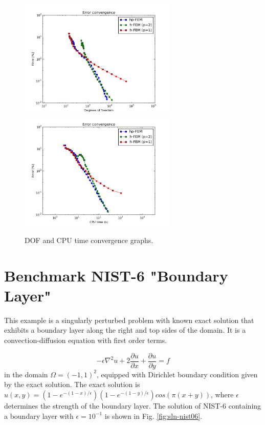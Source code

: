 \documentclass[12pt]{elsarticle}
\begin{document}
\begin{figure}[H]
\centering
\hspace{-50mm}
\includegraphics[width=7.5cm]{nist/nist-5/conv_dof_aniso.png}\ \
\hspace{-10mm}
\includegraphics[width=7.5cm]{nist/nist-5/conv_cpu_aniso.png}
\hspace{-50mm}
\caption{DOF and CPU time convergence graphs.}
\label{fig:nist-5-conv}
\end{figure}


\section{Benchmark NIST-6 "Boundary Layer"}
\label{sec:bench-6}

This example is a singularly perturbed problem with known exact solution that exhibits
a boundary layer along the right and top sides of the domain.
It is a convection-diffusion equation with first order terms.

\begin{equation} \label{boundary-layer}
-\epsilon \nabla^{2} u + 2\frac{\partial u}{\partial x} + \frac{\partial u}{\partial y} = f
\end{equation}
in the domain $\Omega = (-1, 1)^2$, equipped with Dirichlet boundary condition
given by the exact solution. The exact solution is
$u(x,y) = (1 - e^{-(1 - x) / \epsilon})(1 - e^{-(1 - y) / \epsilon})cos(\pi (x + y))$,
where $\epsilon$ determines the strength of the boundary layer.
The solution of NIST-6 containing a boundary layer
with $\epsilon = 10^{-1}$ is shown in Fig. \ref{fig:sln-nist06}.
\end{document}
